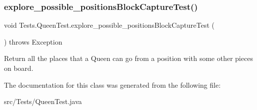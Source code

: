 \subsubsection{\texorpdfstring{explore\+\_\+possible\+\_\+positions\+Block\+Capture\+Test()}{explore\_possible\_positionsBlockCaptureTest()}}
{\footnotesize\ttfamily void Tests.\+Queen\+Test.\+explore\+\_\+possible\+\_\+positions\+Block\+Capture\+Test (\begin{DoxyParamCaption}{ }\end{DoxyParamCaption}) throws Exception\hspace{0.3cm}{\ttfamily [inline]}}

Return all the places that a Queen can go from a position with some other pieces on board. 

The documentation for this class was generated from the following file\+:\begin{DoxyCompactItemize}
\item 
src/\+Tests/Queen\+Test.\+java\end{DoxyCompactItemize}
